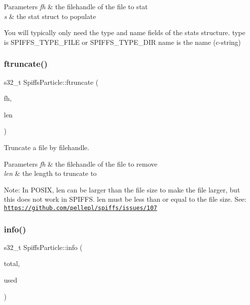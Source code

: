 \begin{DoxyParams}{Parameters}
{\em fh} & the filehandle of the file to stat \\
\hline
{\em s} & the stat struct to populate\\
\hline
\end{DoxyParams}
You will typically only need the type and name fields of the stats structure. type is S\+P\+I\+F\+F\+S\+\_\+\+T\+Y\+P\+E\+\_\+\+F\+I\+LE or S\+P\+I\+F\+F\+S\+\_\+\+T\+Y\+P\+E\+\_\+\+D\+IR name is the name (c-\/string) \mbox{\label{class_spiffs_particle_a9bcb248af1aa3fe66b6a853304765e35}} 
\subsubsection{\texorpdfstring{ftruncate()}{ftruncate()}}
{\footnotesize\ttfamily s32\+\_\+t Spiffs\+Particle\+::ftruncate (\begin{DoxyParamCaption}\item[{spiffs\+\_\+file}]{fh,  }\item[{s32\+\_\+t}]{len }\end{DoxyParamCaption})\hspace{0.3cm}{\ttfamily [inline]}}



Truncate a file by filehandle. 


\begin{DoxyParams}{Parameters}
{\em fh} & the filehandle of the file to remove \\
\hline
{\em len} & the length to truncate to\\
\hline
\end{DoxyParams}
Note\+: In P\+O\+S\+IX, len can be larger than the file size to make the file larger, but this does not work in S\+P\+I\+F\+FS. len must be less than or equal to the file size. See\+: \href{https://github.com/pellepl/spiffs/issues/107}{\tt https\+://github.\+com/pellepl/spiffs/issues/107} \mbox{\label{class_spiffs_particle_afb2bb434707069b737e54fb342e9831b}} 
\subsubsection{\texorpdfstring{info()}{info()}}
{\footnotesize\ttfamily s32\+\_\+t Spiffs\+Particle\+::info (\begin{DoxyParamCaption}\item[{u32\+\_\+t $\ast$}]{total,  }\item[{u32\+\_\+t $\ast$}]{used }\end{DoxyParamCaption})\hspace{0.3cm}{\ttfamily [inline]}}



